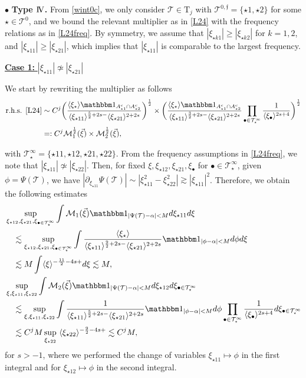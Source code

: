 \documentclass[a4paper,
11pt,  reqno]{amsart}
\newcommand{\IV}{\textup{I \hspace{-2.9mm} V}}
\newcommand{\5}{\textup{V}}
\newcommand{\noi}{\noindent}
\newcommand{\ind}{\mathbbm 1}
\newcommand{\les}{\lesssim}
\theoremstyle{remark}
\newcommand{\bul}{\bullet}
\newcommand{\TT}{\mathcal{T}}
\newcommand{\Tr}{\mathrm{T}}
\newcommand{\al}{\alpha}
\newcommand{\ges}{\gtrsim}
\newcommand{\jb}[1]
{\langle #1 \rangle}
\newcommand{\ff}{\mathfrak{f}}
\newcommand{\M}{\mathcal{M}}
\numberwithin{equation}{section}
\numberwithin{theorem}{section}
\begin{document}
\medskip

\noi
$\bul$ \textbf{Type $\IV$.}
From \eqref{wint0c},
we only consider $\TT\in\Tr_j$
 with $\TT^{0,\ff} = \{\star1,\star2\}$ for some $\star \in \TT^0$, and we bound the relevant multiplier as in \eqref{L24} with the frequency relations as in \eqref{L24freq}.
By symmetry, we assume that $|\xi_{\star k1 }| \ge |\xi_{\star k 2} | $ for $k=1,2$, and $|\xi_{\star11}| \ge |\xi_{\star21}|$, which implies that $|\xi_{\star11}|$ is comparable to the largest frequency. 


\smallskip
\noi
\underline{\textbf{Case 1:} $|\xi_{\star11}| \not\simeq |\xi_{\star21}|$}



We start by rewriting the multiplier as follows
\begin{align}
\text{r.h.s. \eqref{L24}}
& 
\sim C^j   \bigg( \frac{\jb{\xi_\star}
\ind_{ A^c_{\star1} \cap A^c_{\star2}}
}{\jb{\xi_{\star11}}^{\frac52+2s-} \jb{\xi_{\star21}}^{2+2s}}  \bigg)^\frac12 
\times 
\bigg(
\frac{
\jb{\xi_\star}
\ind_{ A^c_{\star1} \cap A^c_{\star2}}
}{
\jb{\xi_{\star11}}^{\frac32+2s-}
\jb{\xi_{\star21}}^{2+2s}
}
\prod_{\bul\in \TT^\infty_\star} \frac{1}{\jb{\xi_\bul}^{2s+4}}
\bigg)^\frac12
\\
&
=: C^j \M_1^\frac12(\vec\xi) \times \M_2^\frac12 (\vec\xi)
,
\end{align}

\noi
with $\TT^\infty_\star =\{\star11, \star12, \star21, \star22\}$.
From the frequency assumptions in \eqref{L24freq}, we note that $|\xi_{\star11}| \not\simeq |\xi_{\star22}|$. 
Then, for fixed $\xi, \xi_{\star12}, \xi_{\star21}, \xi_\bul$ for $\bul\in \TT^\infty_\star$, given $\phi = \Psi(\TT)$, we have $|\partial_{\xi_{\star11}} \Psi(\TT) | \sim  |\xi_{\star11}^2 - \xi_{\star22}^2| \ges |\xi_{\star11}|^2$. Therefore, we obtain the following estimates
\begin{align}
& 
\sup_{\xi_{\star12}, \xi_{\star21}, \xi_{\bul\in \TT^\infty_\star}}
\int \M_1 (\vec\xi) \ind_{|\Psi(\TT) - \al| < M } d\xi_{\star11} d\xi 
\\
&
\quad 
\les 
\sup_{\xi_{\star12}, \xi_{\star21}, \xi_{\bul\in \TT^\infty_\star}}
\int 
\frac{\jb{\xi_\star} }{ \jb{\xi_{\star11}}^{\frac92 + 2s-} \jb{\xi_{\star21}}^{2+2s} } \ind_{|\phi - \al| < M } d\phi d\xi 
\\
&
\quad 
\les M \int \jb{\xi}^{-\frac{11}{2} - 4s + } d\xi \les M, 
\\
&
\sup_{\xi, \xi_{\star11}, \xi_{\star22}} 
\int \M_2(\vec\xi)  \ind_{|\Psi(\TT) - \al| < M} 
d \xi_{\star12} 
d\xi_{\bul \in \TT^\infty_\star}
\\
&
\quad 
\les 
\sup_{\xi, \xi_{\star11}, \xi_{\star22}} 
\int 
\frac{ 1  }{ \jb{\xi_{\star11}}^{\frac52 + 2s -} \jb{\xi_{\star21}}^{2+2s} } \ind_{|\phi - \al| < M} d\phi 
\prod_{\bul\in \TT^\infty_\star} \frac{1}{\jb{\xi_\bul}^{2s+4}}
d\xi_{\bul \in \TT^\infty_\star}
\\
&
\quad 
\les
 C^{j} M  \sup_{\xi_{\star22}}\ \jb{\xi_{\star22}}^{- \frac92 - 4s + } \les C^{j} M 
, 
\end{align}
for $s>-1$,
where we performed the change of variables $\xi_{\star11} \mapsto \phi$ in the first integral 
and for $\xi_{\star12} \mapsto \phi$ in the second integral.
\end{document}
